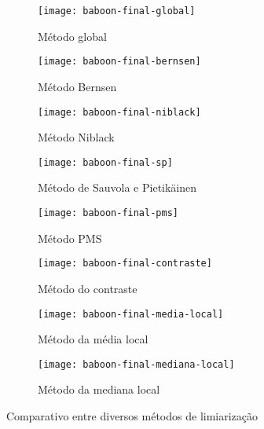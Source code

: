 \documentclass[brazilian,a4paper,twocolumn]{article}
\begin{document}
        \begin{figure}
            \centering
            \begin{subfigure}{0.23\textwidth}
                \texttt{[image: baboon-final-global]}
                \caption{Método global}
                \label{fig:baboon-global}
            \end{subfigure}
            \begin{subfigure}{0.23\textwidth}
                \texttt{[image: baboon-final-bernsen]}
                \caption{Método Bernsen}
                \label{fig:baboon-bernsen}
            \end{subfigure}
            \begin{subfigure}{0.23\textwidth}
                \texttt{[image: baboon-final-niblack]}
                \caption{Método Niblack}
                \label{fig:baboon-niblack}
            \end{subfigure}
            \begin{subfigure}{0.23\textwidth}
                \texttt{[image: baboon-final-sp]}
                \caption{Método de Sauvola e Pietikäinen}
                \label{fig:baboon-sp}
            \end{subfigure}
            \begin{subfigure}{0.23\textwidth}
                \texttt{[image: baboon-final-pms]}
                \caption{Método PMS}
                \label{fig:baboon-pms}
            \end{subfigure}
            \begin{subfigure}{0.23\textwidth}
                \texttt{[image: baboon-final-contraste]}
                \caption{Método do contraste}
                \label{fig:baboon-contraste}
            \end{subfigure}
            \begin{subfigure}{0.23\textwidth}
                \texttt{[image: baboon-final-media-local]}
                \caption{Método da média local}
                \label{fig:baboon-media}
            \end{subfigure}
            \begin{subfigure}{0.23\textwidth}
                \texttt{[image: baboon-final-mediana-local]}
                \caption{Método da mediana local}
                \label{fig:baboon-mediana}
            \end{subfigure}

            \caption{Comparativo entre diversos métodos de limiarização}
            \label{fig:baboon-limiarizacao}
        \end{figure}
\end{document}
